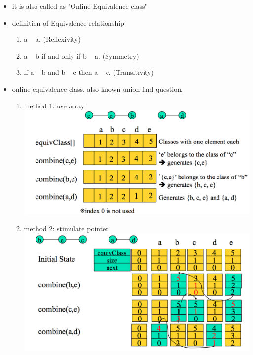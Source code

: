 \documentclass[a4paper,11pt,twoside]{book}
\begin{document}
\begin{itemize}
	\item it is also called as "Online Equivalence class"
	
	\item definition of Equivalence relationship
	\begin{enumerate}
		\item a ~ a. (Reflexivity)
		\item a ~ b if and only if b ~ a. (Symmetry)
		\item if a ~ b and b ~ c then a ~ c. (Transitivity)
	\end{enumerate}
	
	\item online equivalence class, also known union-find question.  
	\begin{enumerate}
		\item method 1: use array  \newline 
		\includegraphics[scale=0.55]{pics/online_1.png} 
		
		\item method 2: stimulate pointer \newline 
		\includegraphics[scale=0.55]{pics/online_2.png}  
	\end{enumerate}
	
\end{itemize}
	
\end{document}

